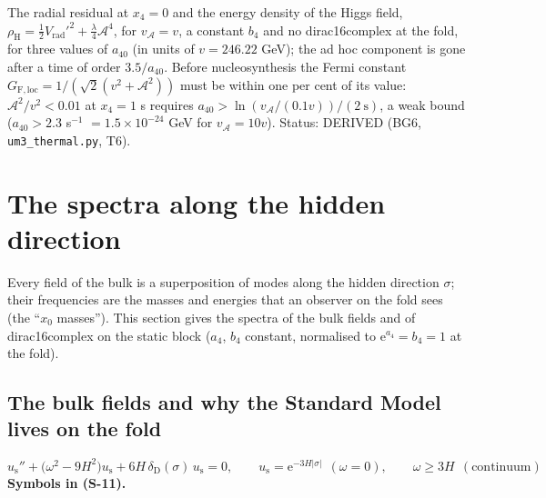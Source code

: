 \documentclass[
  10pt,
]{article}
\begin{document}
The radial residual at \(x_4 = 0\) and the energy density of the Higgs
field,
\(\rho_{\mathrm{H}} = \frac12V_{\mathrm{rad}}'^2 + \frac{\lambda}{4}\mathcal{A}^4\),
for \(v_{\mathcal{A}} = v\), a constant \(b_4\) and no dirac16complex at
the fold, for three values of \(a_{40}\) (in units of \(v = 246.22\)
GeV); the ad hoc component is gone after a time of order \(3.5/a_{40}\).
Before nucleosynthesis the Fermi constant
\(G_{\mathrm{F,loc}} = 1/(\sqrt2(v^2 + \mathcal{A}^2))\) must be within
one per cent of its value: \(\mathcal{A}^2/v^2 < 0.01\) at \(x_4 = 1\) s
requires \(a_{40} > \ln(v_{\mathcal{A}}/(0.1v))/(2\ \text{s})\), a weak
bound (\(a_{40} > 2.3\) s\(^{-1}\) \(= 1.5\times10^{-24}\) GeV for
\(v_{\mathcal{A}} = 10v\)). Status: DERIVED (BG6,
\texttt{um3\_thermal.py}, T6).

\hypertarget{the-spectra-along-the-hidden-direction}{%
\section{The spectra along the hidden
direction}\label{the-spectra-along-the-hidden-direction}}

Every field of the bulk is a superposition of modes along the hidden
direction \(\sigma\); their frequencies are the masses and energies that
an observer on the fold sees (the ``\(x_0\) masses''). This section
gives the spectra of the bulk fields and of dirac16complex on the static
block (\(a_4\), \(b_4\) constant, normalised to
\(\mathrm{e}^{a_4} = b_4 = 1\) at the fold).

\hypertarget{the-bulk-fields-and-why-the-standard-model-lives-on-the-fold}{%
\subsection{The bulk fields and why the Standard Model lives on the
fold}\label{the-bulk-fields-and-why-the-standard-model-lives-on-the-fold}}

\[
u_{\mathrm{s}}'' + \big(\omega^2 - 9H^2\big)u_{\mathrm{s}} + 6H\,\delta_{\mathrm{D}}(\sigma)\,u_{\mathrm{s}} = 0,\qquad
u_{\mathrm{s}} = \mathrm{e}^{-3H\lvert\sigma\rvert}\ \ (\omega = 0),\qquad \omega \ge 3H\ \ (\text{continuum}) \tag{S-11}
\] \textbf{Symbols in (S-11).}
\end{document}
